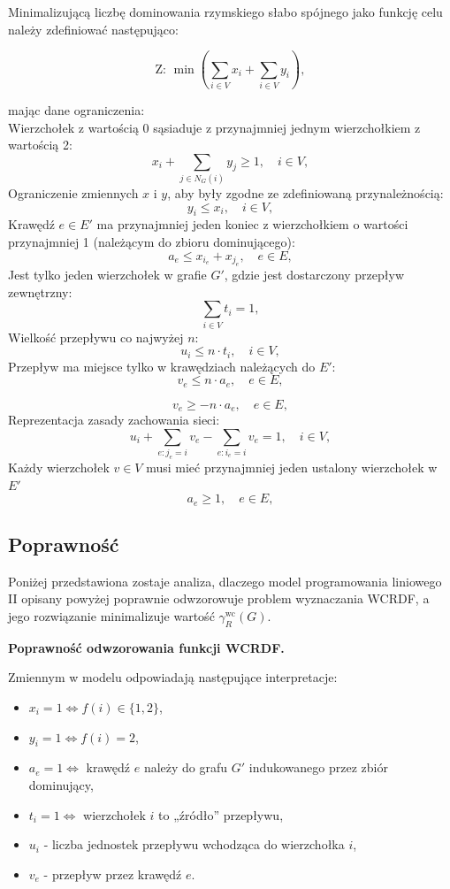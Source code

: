 Minimalizującą liczbę dominowania rzymskiego słabo spójnego jako funkcję celu należy zdefiniować następująco:

\[
\text{Z: } \min \left( \sum_{i \in V} x_i + \sum_{i \in V} y_i \right),
\]

mając dane ograniczenia:\\
Wierzchołek z wartością 0 sąsiaduje z przynajmniej jednym wierzchołkiem z wartością 2:
\[
x_i + \sum_{j \in N_G(i)} y_j \geq 1, \quad i \in V, \tag{1}
\]
Ograniczenie zmiennych $x$ i $y$, aby były zgodne ze zdefiniowaną przynależnością:
\[
y_i \leq x_i, \quad i \in V, \tag{2}
\]
Krawędź $e \in E'$ ma przynajmniej jeden koniec z wierzchołkiem o wartości przynajmniej 1 (należącym do zbioru dominującego):
\[
a_e \leq x_{i_e} + x_{j_e}, \quad e \in E, \tag{3}
\]
Jest tylko jeden wierzchołek w grafie $G'$, gdzie jest dostarczony przepływ zewnętrzny:
\[
\sum_{i \in V} t_i = 1, \tag{4}
\]
Wielkość przepływu co najwyżej $n$:
\[
u_i \leq n \cdot t_i, \quad i \in V, \tag{5}
\]
Przepływ ma miejsce tylko w krawędziach należących do $E'$:
\[
v_e \leq n \cdot a_e, \quad e \in E, \tag{6}
\]

\[
v_e \geq -n \cdot a_e, \quad e \in E, \tag{7}
\]
Reprezentacja zasady zachowania sieci:
\[
u_i + \sum_{e: j_e = i} v_e - \sum_{e: i_e = i} v_e = 1, \quad i \in V, \tag{8}
\]
Każdy wierzchołek $v \in V$ musi mieć przynajmniej jeden ustalony wierzchołek w $E'$
\[
a_e \geq 1, \quad e \in E, \tag{9}
\]

\subsection{Poprawność}

Poniżej przedstawiona zostaje analiza, dlaczego model programowania liniowego II opisany
powyżej poprawnie odwzorowuje problem wyznaczania WCRDF, a jego rozwiązanie minimalizuje
wartość $\gamma_R^{\text{wc}}(G)$.

\textbf{Poprawność odwzorowania funkcji WCRDF.}

Zmiennym w modelu odpowiadają następujące interpretacje:
\begin{itemize}
    \item $x_i = 1 \iff f(i) \in \{1,2\}$,
    \item $y_i = 1 \iff f(i) = 2$,
    \item $a_e = 1 \iff$ krawędź $e$ należy do grafu $G'$ indukowanego przez zbiór dominujący,
    \item $t_i = 1 \iff$ wierzchołek $i$ to „źródło” przepływu,
    \item $u_i$ - liczba jednostek przepływu wchodząca do wierzchołka $i$,
    \item $v_e$ - przepływ przez krawędź $e$.
\end{itemize}

